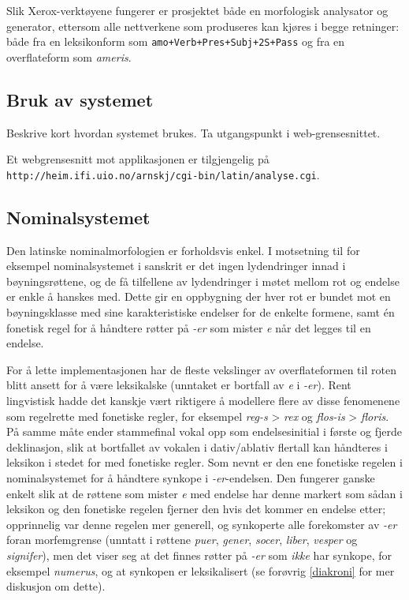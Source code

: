 \documentclass{article}
\newcommand\form[1]{\texttt{#1}} %
\newcommand\note[1]{\marginpar{\raggedright\tiny#1}}
\newcommand\w[1]{\emph{#1}}
\begin{document}
Slik Xerox-verkt\o{}yene fungerer er prosjektet b\aa{}de en morfologisk
analysator og generator, ettersom alle nettverkene som produseres kan
kj\o{}res i begge retninger: b\aa{}de fra en leksikonform som
\form{amo+Verb+Pres+Subj+2S+Pass} og fra en overflateform som \w{ameris}.

\subsection{Bruk av systemet}
Beskrive kort hvordan systemet brukes. Ta utgangspunkt i web-grensesnittet.

Et webgrensesnitt mot applikasjonen er tilgjengelig p\aa{}
\texttt{http://heim.ifi.uio.no/arnskj/cgi-bin/latin/analyse.cgi}.

\subsection{Nominalsystemet}
\label{deklinasjon}
Den latinske nominalmorfologien er forholdsvis enkel. I motsetning til for
eksempel nominalsystemet i sanskrit er det ingen lydendringer innad i
b\o{}yningsr\o{}ttene, og de f\aa{} tilfellene av lydendringer i m\o{}tet
mellom rot og endelse er enkle \aa{} hanskes med. Dette gir en oppbygning der
hver rot er bundet mot en b\o{}yningsklasse med sine karakteristiske endelser
for de enkelte formene, samt \'en fonetisk regel for \aa{} h\aa{}ndtere
r\o{}tter p\aa{} \w{-er} som mister \w{e} n\aa{}r det legges til en endelse.

For \aa{} lette implementasjonen har de fleste vekslinger av overflateformen
til roten blitt ansett for \aa{} v\ae{}re leksikalske (unntaket er bortfall av
\w{e} i \w{-er}). Rent lingvistisk hadde det kanskje v\ae{}rt riktigere \aa{}
modellere flere av disse fenomenene som regelrette med fonetiske regler, for
eksempel \w{reg-s} > \w{rex} og \w{flos-is} > \w{floris}. P\aa{} samme
m\aa{}te ender stammefinal vokal opp som endelsesinitial i f\o{}rste og fjerde
deklinasjon, slik at bortfallet av vokalen i dativ/ablativ flertall kan
h\aa{}ndteres i leksikon i stedet for med fonetiske regler. Som nevnt er den
ene fonetiske regelen i nominalsystemet for \aa{} h\aa{}ndtere
synkope\note{Synkope er riktig, no?} i \w{-er}-endelsen. Den fungerer ganske
enkelt slik at de r\o{}ttene som mister \w{e} med endelse har denne markert
som s\aa{}dan i leksikon og den fonetiske regelen fjerner den hvis det kommer
en endelse etter; opprinnelig var denne regelen mer generell, og synkoperte
alle forekomster av \w{-er} foran morfemgrense (unntatt i r\o{}ttene \w{puer},
\w{gener}, \w{socer}, \w{liber}, \w{vesper} og \w{signifer}), men det viser
seg at det finnes r\o{}tter p\aa{} \w{-er} som \emph{ikke} har synkope, for
eksempel \w{numerus}, og at synkopen er leksikalisert (se for\o{}vrig
\ref{diakroni} for mer diskusjon om dette).
\end{document}
